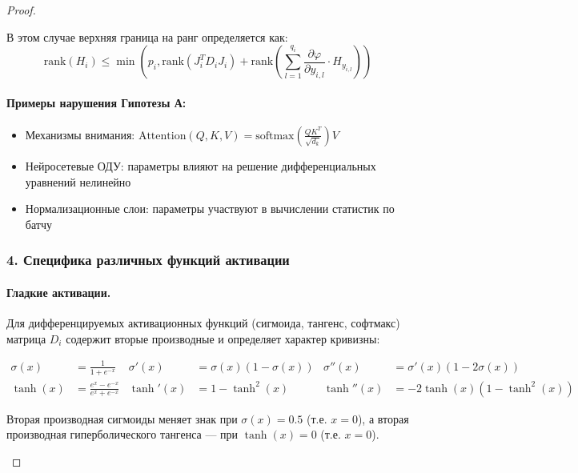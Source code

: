 \documentclass[a4paper,12pt]{article}
\begin{document}
\begin{proof}
\begin{hypothesis}
    В этом случае верхняя граница на ранг определяется как:
    \begin{equation}
    \text{rank}(H_i) \leq \min\left(p_i, \text{rank}(J_i^T D_i J_i) + \text{rank}\left(\sum_{l=1}^{q_i} \frac{\partial \varphi}{\partial y_{i,l}} \cdot H_{y_{i,l}}\right)\right)
    \end{equation}
    \end{hypothesis}
    
    \paragraph{Примеры нарушения Гипотезы А:}
    \begin{itemize}
    \item Механизмы внимания: $\text{Attention}(Q, K, V) = \text{softmax}\left(\frac{QK^T}{\sqrt{d_k}}\right)V$
    \item Нейросетевые ОДУ: параметры влияют на решение дифференциальных уравнений нелинейно
    \item Нормализационные слои: параметры участвуют в вычислении статистик по батчу
    \end{itemize}
    
    \subsubsection*{4. Специфика различных функций активации}
    
    \paragraph{Гладкие активации.} 
    Для дифференцируемых активационных функций (сигмоида, тангенс, софтмакс) матрица $D_i$ содержит вторые производные и определяет характер кривизны:
    
    \begin{align}
    \sigma(x) &= \frac{1}{1+e^{-x}} &\sigma'(x) &= \sigma(x)(1-\sigma(x)) &\sigma''(x) &= \sigma'(x)(1-2\sigma(x)) \\
    \tanh(x) &= \frac{e^x - e^{-x}}{e^x + e^{-x}} &\tanh'(x) &= 1 - \tanh^2(x) &\tanh''(x) &= -2\tanh(x)(1-\tanh^2(x))
    \end{align}
    
    \begin{proposition}
    Вторая производная сигмоиды меняет знак при $\sigma(x) = 0.5$ (т.е. $x = 0$), а вторая производная гиперболического тангенса — при $\tanh(x) = 0$ (т.е. $x = 0$).
    \end{proposition}
    

\end{proof}
\end{document}
